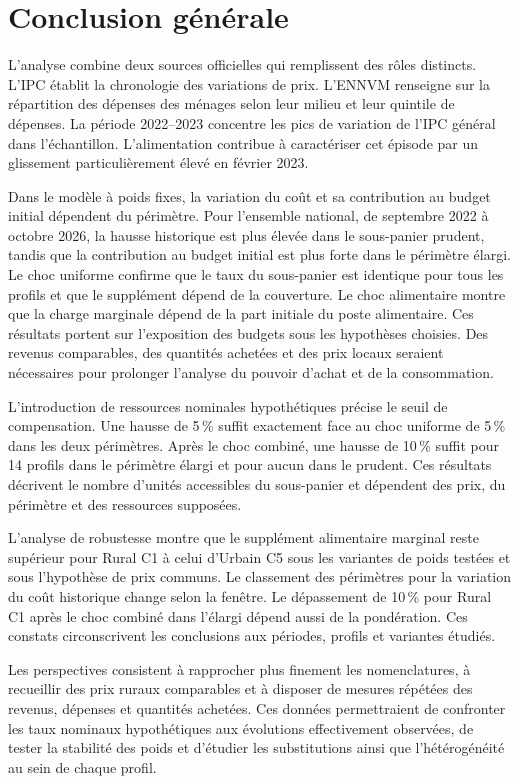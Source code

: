 \chapter*{Conclusion générale}
L'analyse combine deux sources officielles qui remplissent des rôles distincts. L'IPC établit la chronologie des variations de prix. L'ENNVM renseigne sur la répartition des dépenses des ménages selon leur milieu et leur quintile de dépenses. La période 2022--2023 concentre les pics de variation de l'IPC général dans l'échantillon. L'alimentation contribue à caractériser cet épisode par un glissement particulièrement élevé en février 2023.

Dans le modèle à poids fixes, la variation du coût et sa contribution au budget initial dépendent du périmètre. Pour l'ensemble national, de septembre 2022 à octobre 2026, la hausse historique est plus élevée dans le sous-panier prudent, tandis que la contribution au budget initial est plus forte dans le périmètre élargi. Le choc uniforme confirme que le taux du sous-panier est identique pour tous les profils et que le supplément dépend de la couverture. Le choc alimentaire montre que la charge marginale dépend de la part initiale du poste alimentaire. Ces résultats portent sur l'exposition des budgets sous les hypothèses choisies. Des revenus comparables, des quantités achetées et des prix locaux seraient nécessaires pour prolonger l'analyse du pouvoir d'achat et de la consommation.

L'introduction de ressources nominales hypothétiques précise le seuil de compensation. Une hausse de 5\,\% suffit exactement face au choc uniforme de 5\,\% dans les deux périmètres. Après le choc combiné, une hausse de 10\,\% suffit pour 14 profils dans le périmètre élargi et pour aucun dans le prudent. Ces résultats décrivent le nombre d'unités accessibles du sous-panier et dépendent des prix, du périmètre et des ressources supposées.

L'analyse de robustesse montre que le supplément alimentaire marginal reste supérieur pour Rural C1 à celui d'Urbain C5 sous les variantes de poids testées et sous l'hypothèse de prix communs. Le classement des périmètres pour la variation du coût historique change selon la fenêtre. Le dépassement de 10\,\% pour Rural C1 après le choc combiné dans l'élargi dépend aussi de la pondération. Ces constats circonscrivent les conclusions aux périodes, profils et variantes étudiés.

Les perspectives consistent à rapprocher plus finement les nomenclatures, à recueillir des prix ruraux comparables et à disposer de mesures répétées des revenus, dépenses et quantités achetées. Ces données permettraient de confronter les taux nominaux hypothétiques aux évolutions effectivement observées, de tester la stabilité des poids et d'étudier les substitutions ainsi que l'hétérogénéité au sein de chaque profil.

